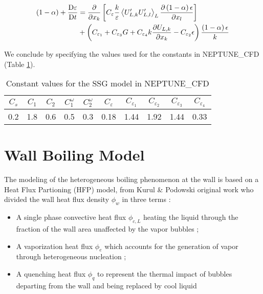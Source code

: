 \begin{align}
\left( 1-\alpha \right)+\frac{\mathrm{D}\varepsilon}{\mathrm{D}t}  &= \frac{\partial}{\partial x_{k}}\left[  C_{\varepsilon} \frac{k}{\varepsilon}\left< U'_{L,k}U'_{L,l} \right>_{L}  \frac{\partial \left( 1-\alpha \right) \epsilon}{\partial x_{l}}  \right] \\
&+ \left( C_{\varepsilon_{1}} + C_{\varepsilon_{3}}G + C_{\varepsilon_{4}}k\frac{\partial U_{L,k}}{\partial x_{k}} - C_{\varepsilon_{2}}\epsilon  \right) \frac{\left( 1-\alpha \right)\epsilon}{k}
\end{align}

\npar

We conclude by specifying the values used for the constants in NEPTUNE\_CFD (Table \ref{tab:ncfd_ssg_constants}).


\begin{table}[!h]
\centering
\begin{tabular}{c c c c c c c c c c} 
\hline
$C_{s}$ & $C_{1}$ & $C_{2}$ & $C_{1}^{\omega}$ & $C_{2}^{\omega}$ & $C_{\varepsilon}$ & $C_{\varepsilon_{1}}$ & $C_{\varepsilon_{2}}$ & $C_{\varepsilon_{3}}$ & $C_{\varepsilon_{4}}$ \\
\hline
0.2 & 1.8 & 0.6 & 0.5 & 0.3 & 0.18 & 1.44 & 1.92 & 1.44 & 0.33\\
\hline
\end{tabular}

\caption{Constant values for the SSG model in NEPTUNE\_CFD}
\label{tab:ncfd_ssg_constants}

\end{table}




\section{Wall Boiling Model}
\label{sec:ncfd_HFP}

The modeling of the heterogeneous boiling phenomenon at the wall is based on a Heat Flux Partioning (HFP) model,  from Kurul \& Podowski original work\cite{kurul_multidimensional_1990} who divided the wall heat flux density $\phi_{w}$ in three terms  :

\begin{itemize}
\item A single phase convective heat flux $\phi_{c,L}$ heating the liquid through the fraction of the wall area unaffected by the vapor bubbles ;
\item A vaporization heat flux $\phi_{e}$ which accounts for the generation of vapor through heterogeneous nucleation ;
\item A quenching heat flux $\phi_{q}$ to represent the thermal impact of bubbles departing from the wall and being replaced by cool liquid
\end{itemize}

